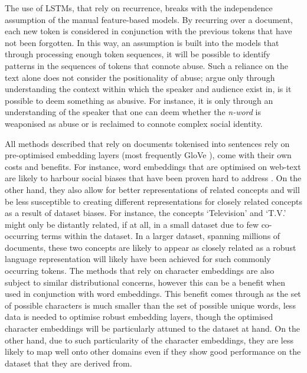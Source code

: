 The use of LSTMs, that rely on recurrence, breaks with the independence assumption of the manual feature-based models.  
By recurring over a document, each new token is considered in conjunction with the previous tokens that have not been forgotten.  
In this way, an assumption is built into the models that through processing enough token sequences, it will be possible to identify patterns in the sequences of tokens that connote abuse.  
Such a reliance on the text alone does not consider the positionality of abuse; \citet{Waseem:2018} argue only through understanding the context within which the speaker and audience exist in, is it possible to deem something as abusive.  
For instance, it is only through an understanding of the speaker that one can deem whether the \textit{n-word} is weaponised as abuse or is reclaimed to connote complex social identity.  
  
All methods described that rely on documents tokenised into sentences rely on pre-optimised embedding layers (most frequently GloVe \citet{Pennington:2014}), come with their own costs and benefits.  
For instance, word embeddings that are optimised on web-text are likely to harbour social biases \citep{Bolukbasi:2016} that have been proven hard to address \citep{Gonen:2019}.  
On the other hand, they also allow for better representations of related concepts and will be less susceptible to creating different representations for closely related concepts as a result of dataset biases.  
For instance, the concepts `Television' and `T.V.' might only be distantly related, if at all, in a small dataset due to few co-occurring terms within the dataset.  
In a larger dataset, spanning millions of documents, these two concepts are likely to appear as closely related as a robust language representation will likely have been achieved for such commonly occurring tokens.  
The methods that rely on character embeddings are also subject to similar distributional concerns, however this can be a benefit when used in conjunction with word embeddings.  
This benefit comes through as the set of possible characters is much smaller than the set of possible unique words, less data is needed to optimise robust embedding layers, though the optimised character embeddings will be particularly attuned to the dataset at hand.  
On the other hand, due to such particularity of the character embeddings, they are less likely to map well onto other domains even if they show good performance on the dataset that they are derived from.  
  
